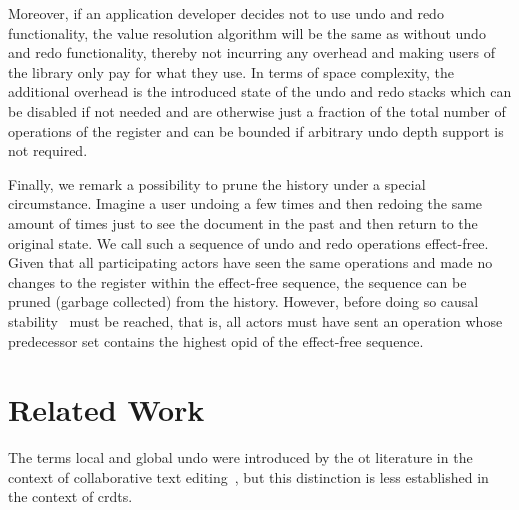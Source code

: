 \documentclass[sigplan,natbib=false,review]{acmart}
\begin{document}
Moreover, if an application developer decides not to use undo and redo functionality,
the value resolution algorithm will be the same as without undo and redo functionality,
thereby not incurring any overhead and making users of the library only
pay for what they use.
In terms of space complexity, the additional overhead is the introduced state
of the undo and redo stacks which can be disabled if not needed and are otherwise
just a fraction of the total number of operations of the register and can be
bounded if arbitrary undo depth support is not required.

Finally, we remark a possibility to prune the history under a special circumstance.
Imagine a user undoing a few times and then redoing the same amount of times
just to see the document in the past and then return to the original state.
We call such a sequence of undo and redo operations effect-free.
Given that all participating actors have seen the same operations and made no
changes to the register within the effect-free sequence,
the sequence can be pruned (garbage collected) from the history.
However, before doing so causal stability~\cite{baquero2017pure}
must be reached, that is, all
actors must have sent an operation whose predecessor set contains the
highest \gls*{opid} of the effect-free sequence.

\section{Related Work}\label{sec:related-work}


The terms local and global undo were introduced by the \acrlong{ot}
literature in the context of collaborative text
editing~\cite{sun2000undo,ressel1999reducing, abowd1992giving},
but this distinction is less established in the context of \glspl{crdt}.
\end{document}
